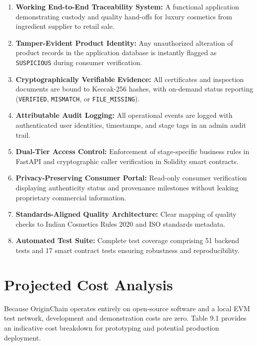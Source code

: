 \documentclass[12pt,a4paper]{report}
\begin{document}
\begin{enumerate}[leftmargin=1.5em]
    \item \textbf{Working End-to-End Traceability System:} A functional application demonstrating custody and quality hand-offs for luxury cosmetics from ingredient supplier to retail sale.
    \item \textbf{Tamper-Evident Product Identity:} Any unauthorized alteration of product records in the application database is instantly flagged as \texttt{SUSPICIOUS} during consumer verification.
    \item \textbf{Cryptographically Verifiable Evidence:} All certificates and inspection documents are bound to Keccak-256 hashes, with on-demand status reporting (\texttt{VERIFIED}, \texttt{MISMATCH}, or \texttt{FILE\_MISSING}).
    \item \textbf{Attributable Audit Logging:} All operational events are logged with authenticated user identities, timestamps, and stage tags in an admin audit trail.
    \item \textbf{Dual-Tier Access Control:} Enforcement of stage-specific business rules in FastAPI and cryptographic caller verification in Solidity smart contracts.
    \item \textbf{Privacy-Preserving Consumer Portal:} Read-only consumer verification displaying authenticity status and provenance milestones without leaking proprietary commercial information.
    \item \textbf{Standards-Aligned Quality Architecture:} Clear mapping of quality checks to Indian Cosmetics Rules 2020 and ISO standards metadata.
    \item \textbf{Automated Test Suite:} Complete test coverage comprising 51 backend tests and 17 smart contract tests ensuring robustness and reproducibility.
\end{enumerate}

\chapter{Projected Cost Analysis}

Because OriginChain operates entirely on open-source software and a local EVM test network, development and demonstration costs are zero. Table 9.1 provides an indicative cost breakdown for prototyping and potential production deployment.
\end{document}
